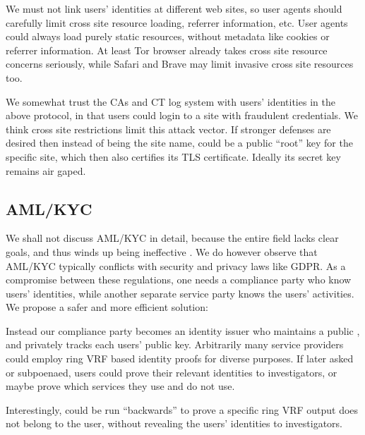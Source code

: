 We must not link users' identities at different web sites, so user agents
should carefully limit cross site resource loading, referrer information, etc.
User agents could always load purely static resources, without metadata
like cookies or referrer information.
At least Tor browser already takes cross site resource concerns seriously,
while Safari and Brave may limit invasive cross site resources too.

We somewhat trust the CAs and CT log system with users' identities in
the above protocol, in that users could login to a site with fraudulent
credentials.  We think cross site restrictions limit this attack vector.
If stronger defenses are desired then instead of \msg being the site name,
\msg could be a public ``root'' key for the specific site, which then
also certifies its TLS certificate.  Ideally its secret key remains air gaped.


\subsection{AML/KYC}
\label{subsec:AML_KYC}

We shall not discuss AML/KYC in detail, because the entire field lacks
clear goals, and thus winds up being ineffective
 \cite{doi:10.1080/25741292.2020.1725366}.
We do however observe that AML/KYC typically conflicts with security
and privacy laws like GDPR.  As a compromise between these regulations,
one needs a compliance party who know users' identities,
 while another separate service party knows the users' activities.
We propose a safer and more efficient solution:

Instead our compliance party becomes an identity issuer who maintains
a public \ring, and privately tracks each users' public key.
Arbitrarily many service providers could employ ring VRF based identity
proofs for diverse purposes.
If later asked or subpoenaed, users could prove their relevant identities
to investigators, or maybe prove which services they use and do not use. 

Interestingly, \PedVRF could be run ``backwards'' to prove a specific
ring VRF output does not belong to the user, without revealing the users'
identities to investigators. 

